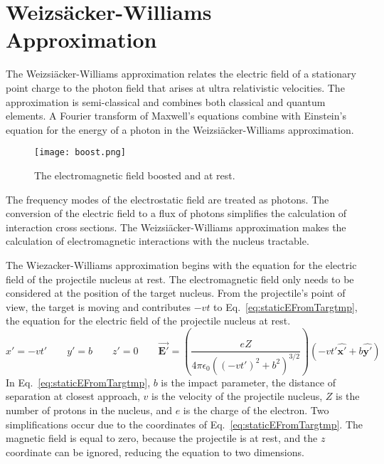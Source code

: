   \section{Weizs\"{a}cker-Williams Approximation \label{sec:wwAprox}}
    The Weizsi\"{a}cker-Williams approximation relates the electric field of a 
      stationary point charge to the photon field that arises at ultra 
      relativistic velocities. 
    The approximation is semi-classical and combines both classical and quantum 
      elements.
    A Fourier transform of Maxwell's equations combine with Einstein's equation 
      for the energy of a photon in the Weizsi\"{a}cker-Williams approximation.
    \begin{wrapfigure}{r}{0.75\textwidth}
      \begin{center}
        \texttt{[image: boost.png]}
      \end{center}
      \caption{ \label{fig:boost} The electromagnetic field boosted and at rest. }
    \end{wrapfigure}
    The frequency modes of the electrostatic field are treated as photons. 
    The conversion of the electric field to a flux of photons simplifies the
      calculation of interaction cross sections. 
    The Weizsi\"{a}cker-Williams approximation makes the calculation of 
      electromagnetic interactions with the nucleus tractable. 

    The Wiezacker-Williams approximation begins with the equation for the 
      electric field of the projectile nucleus at rest. 
    The electromagnetic field only needs to be considered at the position of 
      the target nucleus. 
    From the projectile's point of view, the target is moving and contributes
     $-vt$ to Eq.~\ref{eq:staticEFromTargtmp}, the equation for the electric 
     field of the projectile nucleus at rest.
    \begin{equation} \label{eq:staticEFromTargtmp}
        x'=-vt'\qquad
        y'=b\qquad
        z'=0\qquad
	\vec{\mathbf{E'}}=\left(\frac{eZ}
         {4 \pi \epsilon_{0}\left(\left(-vt'\right)^{2}+b^{2}\right)^{3/2}}\right)
	 \left(-vt'{\mathbf{\hat{x'}}+b\mathbf{\hat{y'}}}\right)
    \end{equation}        
    In Eq.~\ref{eq:staticEFromTargtmp}, $b$ is the impact parameter, 
      the distance of separation at closest approach, $v$ is the velocity of the 
      projectile nucleus, $Z$ is the number of protons in the nucleus, and $e$ 
      is the charge of the electron.
    Two simplifications occur due to the coordinates of 
      Eq.~\ref{eq:staticEFromTargtmp}.
    The magnetic field is equal to zero, because the projectile is at rest, and
      the $z$ coordinate can be ignored, reducing the equation to two dimensions. 

